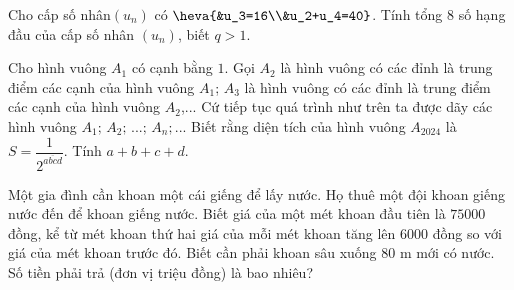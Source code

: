 \begin{ex}%
Cho cấp số nhân$\left(u_n\right)$ có $ \heva{&u_3=16\\&u_2+u_4=40}$. Tính tổng $8$ số hạng đầu của cấp số nhân $\left(u_n\right)$, biết $ q > 1$.
\end{ex}

\begin{ex}%
Cho hình vuông $A_1$ có cạnh bằng $ 1$. Gọi $A_2$ là hình vuông có các đỉnh là trung điểm các cạnh của hình vuông $A_1$; $A_3$ là hình vuông có các đỉnh là trung điểm các cạnh của hình vuông $A_2$,... Cứ tiếp tục quá trình như trên ta được dãy các hình vuông $A_1;\,A_2;\,...;\,A_n;...$ Biết rằng diện tích của hình vuông $A_{2024}$ là $S=\dfrac{1}{2^{\overline{abcd}}}$. Tính $a+b+c+d$.
\end{ex}

\begin{ex}%
Một gia đình cần khoan một cái giếng để lấy nước. Họ thuê một đội khoan giếng nước đến để khoan giếng nước. Biết giá của một mét khoan đầu tiên là $75000$ đồng, kể từ mét khoan thứ hai giá của mỗi mét khoan tăng lên $6000$ đồng so với giá của mét khoan trước đó. Biết cần phải khoan sâu xuống $80$ m mới có nước. Số tiền phải trả (đơn vị triệu  đồng) là bao nhiêu?
\end{ex}
